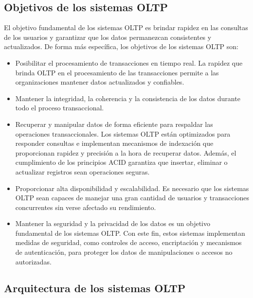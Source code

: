 \subsection{Objetivos de los sistemas OLTP}

El objetivo fundamental de los sistemas OLTP es brindar rapidez en las consultas de los usuarios y 
garantizar que los datos permanezcan consistentes y actualizados. De forma m\'as espec\'ifica, los objetivos de 
los sistemas OLTP son: 

\begin{itemize}
    \item Posibilitar el procesamiento de transacciones en tiempo real. La rapidez que brinda OLTP en el procesamiento de 
        las transacciones permite a las organizaciones mantener datos actualizados y 
        confiables.

    \item Mantener la integridad, la coherencia y la consistencia de los datos durante todo el proceso transaccional.

    \item Recuperar y manipular datos de forma eficiente para respaldar las operaciones transaccionales. Los sistemas OLTP
        est\'an optimizados para responder consultas e implementan mecanismos de indexación que proporcionan rapidez y precisi\'on 
        a la hora de recuperar datos. Adem\'as, el cumplimiento de los principios ACID garantiza que 
        insertar, eliminar o actualizar registros sean operaciones seguras.

    \item Proporcionar alta disponibilidad y escalabilidad. Es necesario que los sistemas OLTP sean capaces de manejar una 
        gran cantidad de usuarios y transacciones concurrentes sin verse afectado su rendimiento.

    \item Mantener la seguridad y la privacidad de los datos es un objetivo fundamental de los sistemas OLTP. Con este fin, 
        estos sistemas implementan medidas de seguridad, como controles de acceso, encriptación y mecanismos de autenticación, 
        para proteger los datos de manipulaciones o accesos no autorizadas.
\end{itemize}

\subsection{Arquitectura de los sistemas OLTP}

